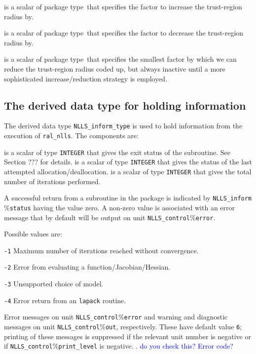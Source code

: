 \documentclass{hslspec}
\newcommand{\scalarinteger}{is a scalar of type {\tt INTEGER} }
\newcommand{\scalarreal}{is a scalar of package type\ }
\begin{document}
\begin{description}
 \scalarreal that specifies the factor to increase the trust-region radius by.

 \scalarreal that specifies the factor to decrease the trust-region radius by.

 \scalarreal that specifies the smallest factor by 
which we can reduce the trust-region radius {\color{red} coded up, but always 
inactive until a more sophisticated increase/reduction strategy is employed}.

\end{description}


\subsection{The derived data type for holding information}
\label{typeinform} 
The derived data type {\tt NLLS\_inform\_type} is used
to hold information from the execution of {\tt ral\_nlls}.
The components are:
\begin{description}
 \scalarinteger that gives the exit status of the subroutine.  See Section {\color{red} ???} for details.
 \scalarinteger that gives the status of the last attempted allocation/deallocation.
 \scalarinteger that gives the total number of iterations performed.
\end{description}


\hslerrors

A successful return from a subroutine in the package is indicated by 
{\tt NLLS\_inform$\%$status} having the value zero.  
A non-zero value is associated with an error message that by default will  
be output on unit {\tt NLLS\_control$\%$error}. 

Possible values are:
\begin{description}
\item{} {\tt -1} Maximum number of iterations reached without convergence.
\item{} {\tt -2} Error from evaluating a function/Jacobian/Hessian.
\item{} {\tt -3} Unsupported choice of model.
\item{} {\tt -4} Error return from an {\tt lapack} routine.
\end{description}

\hslgeneral


\hslio 
   Error messages on unit {\tt NLLS\_control$\%$error} and warning
   and diagnostic messages on unit {\tt NLLS\_control$\%$out},
   respectively. These have default value {\tt 6};
   printing of these messages is suppressed if the relevant unit number
   is negative or if {\tt NLLS\_control$\%$print\_level} is negative.
.  \textcolor{blue}{do you check this? Error code?}

\hslmethod 
\label{method}


\hslexample

\end{document}

